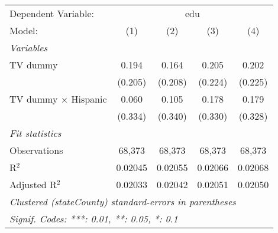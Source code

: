 \begin{tabular}{lcccc}
\tabularnewline\midrule\midrule
Dependent Variable:&\multicolumn{4}{c}{edu}\\
Model:&(1) & (2) & (3) & (4)\\
\midrule \emph{Variables}&   &   &   &  \\
TV dummy & 0.194 & 0.164 & 0.205 & 0.202\\
  &(0.205) & (0.208) & (0.224) & (0.225)\\
TV dummy $\times$ Hispanic & 0.060 & 0.105 & 0.178 & 0.179\\
  &(0.334) & (0.340) & (0.330) & (0.328)\\
\midrule \emph{Fit statistics}&  & & & \\
Observations & 68,373&68,373&68,373&68,373\\
R$^2$ & 0.02045&0.02055&0.02066&0.02068\\
Adjusted R$^2$ & 0.02033&0.02042&0.02051&0.02050\\
\midrule\midrule\multicolumn{5}{l}{\emph{Clustered (stateCounty) standard-errors in parentheses}}\\
\multicolumn{5}{l}{\emph{Signif. Codes: ***: 0.01, **: 0.05, *: 0.1}}\\
\end{tabular}


